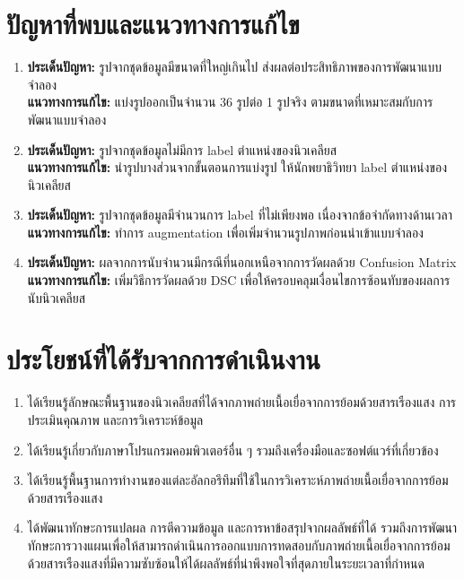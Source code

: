 \documentclass[12pt,oneside,openright,a4paper]{cpe-thai-project}
\begin{document}
\section{ปัญหาที่พบและแนวทางการแก้ไข}
\begin{enumerate}
    \item  \textbf{ประเด็นปัญหา:} รูปจากชุดข้อมูลมีขนาดที่ใหญ่เกินไป ส่งผลต่อประสิทธิภาพของการพัฒนาแบบจำลอง \\ 
    \textbf{แนวทางการแก้ไข:} แบ่งรูปออกเป็นจำนวน 36 รูปต่อ 1 รูปจริง ตามขนาดที่เหมาะสมกับการพัฒนาแบบจำลอง
    \item \textbf{ประเด็นปัญหา:} รูปจากชุดข้อมูลไม่มีการ label ตำแหน่งของนิวเคลียส \\ 
    \textbf{แนวทางการแก้ไข:} นำรูปบางส่วนจากขั้นตอนการแบ่งรูป ให้นักพยาธิวิทยา label ตำแหน่งของนิวเคลียส
    \item \textbf{ประเด็นปัญหา:} รูปจากชุดข้อมูลมีจำนวนการ label ที่ไม่เพียงพอ เนื่องจากข้อจำกัดทางด้านเวลา \\
    \textbf{แนวทางการแก้ไข:} ทำการ augmentation เพื่อเพิ่มจำนวนรูปภาพก่อนนำเข้าแบบจำลอง 
    \item \textbf{ประเด็นปัญหา:} ผลจากการนับจำนวนมีกรณีที่นอกเหนือจากการวัดผลด้วย Confusion Matrix \\
    \textbf{แนวทางการแก้ไข:} เพิ่มวิธีการวัดผลด้วย DSC เพื่อให้ครอบคลุมเงื่อนไขการซ้อนทับของผลการนับนิวเคลียส
\end{enumerate}
\section{ประโยชน์ที่ได้รับจากการดำเนินงาน}
\begin{enumerate}
    \item ได้เรียนรู้ลักษณะพื้นฐานของนิวเคลียสที่ได้จากภาพถ่ายเนื้อเยื่อจากการย้อมด้วยสารเรืองแสง  การประเมินคุณภาพ และการวิเคราะห์ข้อมูล 
    \item ได้เรียนรู้เกี่ยวกับภาษาโปรแกรมคอมพิวเตอร์อื่น ๆ รวมถึงเครื่องมือและซอฟต์แวร์ที่เกี่ยวข้อง
    \item ได้เรียนรู้พื้นฐานการทำงานของแต่ละอัลกอรึทึมที่ใช้ในการวิเคราะห์ภาพถ่ายเนื้อเยื่อจากการย้อมด้วยสารเรืองแสง
    \item ได้พัฒนาทักษะการแปลผล การตีความข้อมูล และการหาข้อสรุปจากผลลัพธ์ที่ได้ รวมถึงการพัฒนาทักษะการวางแผนเพื่อให้สามารถดำเนินการออกแบบการทดสอบกับภาพถ่ายเนื้อเยื่อจากการย้อมด้วยสารเรืองแสงที่มีความซับซ้อนให้ได้ผลลัพธ์ที่น่าพึงพอใจที่สุดภายในระยะเวลาที่กำหนด
\end{enumerate}
\end{document}
